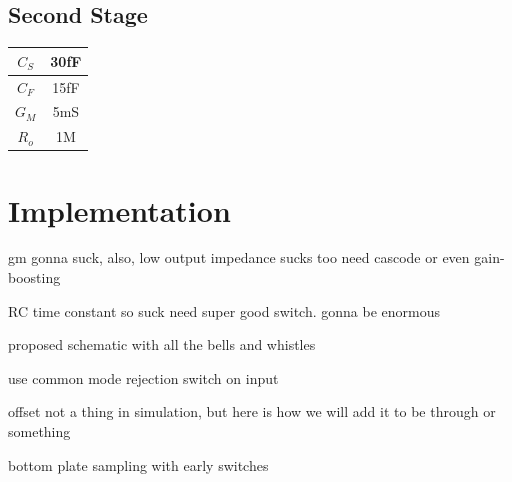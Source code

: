 \documentclass[conference]{IEEEtran}
\begin{document}
\subsection{Second Stage}

\begin{center}
\begin{tabular}{|c|c|} 
\hline
$C_S$ & 30fF \\
\hline
$C_F$ & 15fF \\
\hline
$G_M$ & 5mS \\
\hline
$R_o$ & 1M \\
\hline
\end{tabular}
\end{center}

\section{Implementation}

gm gonna suck, also, low output impedance sucks too
need cascode or even gain-boosting

RC time constant so suck
need super good switch. gonna be enormous

proposed schematic with all the bells and whistles

use common mode rejection switch on input

offset not a thing in simulation, but here is how we will add it to be through or something

bottom plate sampling with early switches








%
%
\end{document}
